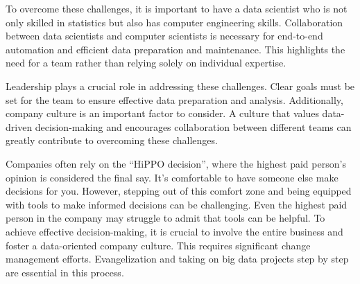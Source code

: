 To overcome these challenges, it is important to have a data scientist
who is not only skilled in statistics but also has computer engineering
skills. Collaboration between data scientists and computer scientists is
necessary for end-to-end automation and efficient data preparation and
maintenance. This highlights the need for a team rather than relying
solely on individual expertise.

Leadership plays a crucial role in addressing these challenges. Clear
goals must be set for the team to ensure effective data preparation and
analysis. Additionally, company culture is an important factor to
consider. A culture that values data-driven decision-making and
encourages collaboration between different teams can greatly contribute
to overcoming these challenges.

Companies often rely on the ``HiPPO decision'', where the highest paid
person's opinion is considered the final say. It's comfortable to have
someone else make decisions for you. However, stepping out of this
comfort zone and being equipped with tools to make informed decisions
can be challenging. Even the highest paid person in the company may
struggle to admit that tools can be helpful. To achieve effective
decision-making, it is crucial to involve the entire business and foster
a data-oriented company culture. This requires significant change
management efforts. Evangelization and taking on big data projects step
by step are essential in this process.
